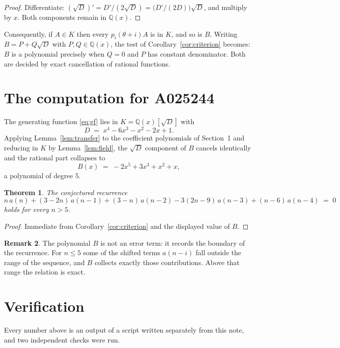 \documentclass[11pt,a4paper]{article}
\theoremstyle{plain}
\newtheorem{theorem}{Theorem}
\theoremstyle{definition}
\newtheorem{remark}[theorem]{Remark}
\begin{document}
\begin{proof}
Differentiate: $(\sqrt{D})'=D'/(2\sqrt{D})=\bigl(D'/(2D)\bigr)\sqrt{D}$, and multiply by
$x$. Both components remain in $\mathbb{Q}(x)$.
\end{proof}

Consequently, if $A\in K$ then every $p_{i}(\theta+i)A$ is in $K$, and so is $B$. Writing
$B=P+Q\sqrt{D}$ with $P,Q\in\mathbb{Q}(x)$, the test of Corollary~\ref{cor:criterion}
becomes: $B$ is a polynomial precisely when $Q=0$ and $P$ has constant denominator. Both
are decided by exact cancellation of rational functions.

\section{The computation for A025244}

The generating function \eqref{eq:gf} lies in $K=\mathbb{Q}(x)[\sqrt{D}]$ with
\[
D \;=\; x^{4} - 6 x^{3} - x^{2} - 2 x + 1 .
\]
Applying Lemma~\ref{lem:transfer} to the coefficient polynomials of Section~1 and reducing
in $K$ by Lemma~\ref{lem:field}, the $\sqrt{D}$ component of $B$ cancels identically and
the rational part collapses to
\[
B(x)\;=\;- 2 x^{5} + 3 x^{3} + x^{2} + x ,
\]
a polynomial of degree $5$.

\begin{theorem}
The conjectured recurrence
\[
n\,a(n) + (3 - 2 n)\,a(n-1) + (3 - n)\,a(n-2) -  3 \left(2 n - 9\right)\,a(n-3) + (n - 6)\,a(n-4) \;=\;0
\]
holds for every $n>5$.
\end{theorem}

\begin{proof}
Immediate from Corollary~\ref{cor:criterion} and the displayed value of $B$.
\end{proof}

\begin{remark}
The polynomial $B$ is not an error term: it records the boundary of the recurrence. For
$n\le5$ some of the shifted terms $a(n-i)$ fall outside the range of the sequence,
and $B$ collects exactly those contributions. Above that range the relation is exact.
\end{remark}

\section{Verification}

Every number above is an output of a script written separately from this note, and two
independent checks were run.
\end{document}
